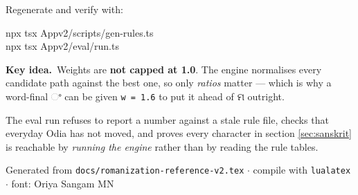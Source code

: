 \documentclass[11pt, a4paper]{article}
\newcommand{\od}[1]{{\odiafont #1}}          %
\newcommand{\kidea}{{\color{midseagreen}\textbf{\textsf{Key idea.}}}\ }
\begin{document}
Regenerate and verify with:

\begin{center}
\begin{minipage}{0.78\textwidth}
\ttfamily\small
npx tsx Appv2/scripts/gen-rules.ts\\
npx tsx Appv2/eval/run.ts
\end{minipage}
\end{center}

\begin{keybox}
\kidea Weights are \textbf{not capped at 1.0}. The engine normalises every candidate path
against the best one, so only \emph{ratios} matter --- which is why a word-final \od{ଂ}
can be given \texttt{w~=~1.6} to put it ahead of \od{ମ} outright.
\end{keybox}

The eval run refuses to report a number against a stale rule file, checks that everyday
Odia has not moved, and proves every character in section \ref{sec:sanskrit} is reachable
by \emph{running the engine} rather than by reading the rule tables.

\vfill
\begin{center}
\small\color{gray}
Generated from \texttt{docs/romanization-reference-v2.tex} \quad$\cdot$\quad
compile with \texttt{lualatex} \quad$\cdot$\quad
font: Oriya Sangam MN
\end{center}
\end{document}
